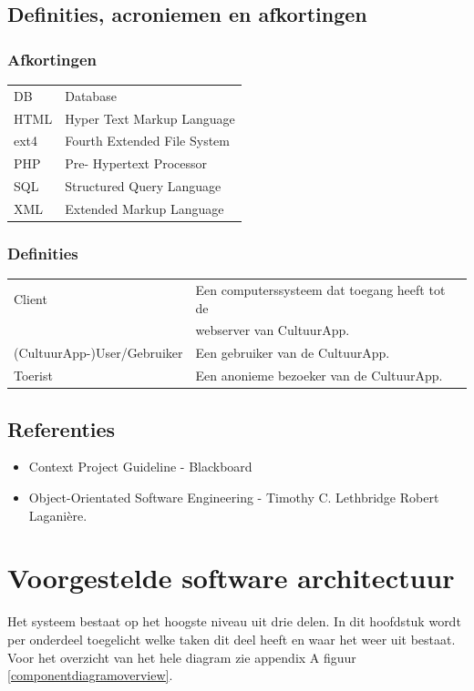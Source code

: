 \documentclass[a4paper,10pt]{article}
\begin{document}
	\subsection{Definities, acroniemen en afkortingen}
		\subsubsection{Afkortingen}
		\begin{tabular}{ l | l }
			DB & Database \\
			HTML & Hyper Text Markup Language \\
			ext4 & Fourth Extended File System \\
			PHP & Pre- Hypertext Processor \\
			SQL & Structured Query Language \\
			XML & Extended Markup Language
		\end{tabular}
	
		\subsubsection{Definities}
		\begin{tabular}{ l | l }
			Client & Een computerssysteem dat toegang heeft tot de\\& webserver van CultuurApp. \\
			(CultuurApp-)User/Gebruiker & Een gebruiker van de CultuurApp.\\
Toerist & Een anonieme bezoeker van de CultuurApp.
		\end{tabular}
		
	\subsection{Referenties}
	\begin{itemize}
		\item Context Project Guideline - Blackboard
		\item Object-Orientated Software Engineering - Timothy C. Lethbridge Robert Lagani\`ere.
	\end{itemize}
	
\section{Voorgestelde software architectuur}
Het systeem bestaat op het hoogste niveau uit drie delen. In dit hoofdstuk wordt per onderdeel toegelicht welke taken dit deel heeft en waar het weer uit bestaat. Voor het overzicht van het hele diagram zie appendix A figuur \ref{componentdiagramoverview}.
\end{document}
